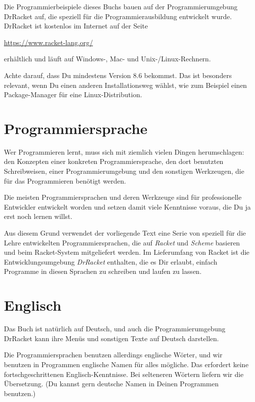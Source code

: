 Die Programmierbeispiele dieses Buchs bauen auf der
Programmierumgebung DrRacket{} auf, die speziell
für die Programmierausbildung entwickelt wurde. 
DrRacket ist kostenlos im Internet auf der Seite
%
\begin{center}
  \url{https://www.racket-lang.org/}
\end{center}
%
erhältlich und läuft auf Windows-, Mac- und Unix-/Linux-Rechnern.

Achte darauf, dass Du mindestens Version 8.6 bekommst.   Das ist
besonders relevant, wenn Du einen anderen Installationsweg wählst, wie
zum Beispiel einen Package-Manager für eine Linux-Distribution.

\section{Programmiersprache}

Wer Programmieren lernt, muss sich mit ziemlich vielen Dingen
herumschlagen: den Konzepten einer konkreten Programmiersprache, den
dort benutzten Schreibweisen, einer Programmierumgebung und den
sonstigen Werkzeugen, die für das Programmieren benötigt werden.

Die meisten Programmiersprachen und deren Werkzeuge sind für
professionelle Entwickler entwickelt worden und setzen damit viele
Kenntnisse voraus, die Du ja erst noch lernen willst.

Aus diesem Grund verwendet der vorliegende Text eine Serie von
speziell für die Lehre entwickelten Programmiersprachen, die auf
\textit{Racket} und \textit{Scheme}
basieren und beim Racket-System mitgeliefert werden.  Im Lieferumfang von
Racket ist die Entwicklungsumgebung \textit{DrRacket} enthalten, die
es Dir erlaubt, einfach Programme in diesen Sprachen zu schreiben und
laufen zu lassen.

\section{Englisch}

Das Buch ist natürlich auf Deutsch, und auch die Programmierumgebung
DrRacket kann ihre Menüs und sonstigen Texte auf Deutsch darstellen.

Die Programmiersprachen benutzen allerdings englische Wörter, und wir
benutzen in Programmen englische Namen für alles mögliche.  Das
erfordert keine fortschgeschrittenen Englisch-Kenntnisse.  Bei
selteneren Wörtern liefern wir die Übersetzung.  (Du kannst gern
deutsche Namen in Deinen Programmen benutzen.)

